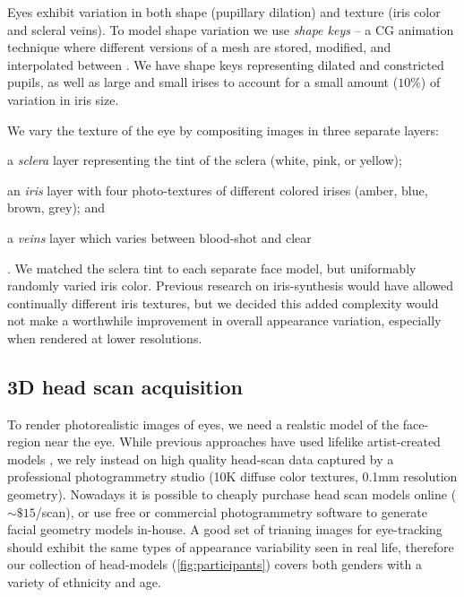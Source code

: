 Eyes exhibit variation in both shape (pupillary dilation) and texture (iris color and scleral veins). To model shape variation we use \emph{shape keys} -- a CG animation technique where different versions of a mesh are stored, modified, and interpolated between \cite{orvalho2012facial}.  We have shape keys representing dilated and constricted pupils, as well as large and small irises to account for a small amount ($10\%$) of variation in iris size.

We vary the texture of the eye by compositing images in three separate layers:
\begin{inparaenum}
\item a \emph{sclera} layer representing the tint of the sclera (white, pink, or yellow);
\item an \emph{iris} layer with four photo-textures of different colored irises (amber, blue, brown, grey); and
\item a \emph{veins} layer which varies between blood-shot and clear
\end{inparaenum}. We matched the sclera tint to each separate face model, but uniformably randomly varied iris color. Previous research on iris-synthesis  would have allowed continually different iris textures, but we decided this added complexity would not make a worthwhile improvement in overall appearance variation, especially when rendered at lower resolutions.

\subsection{3D head scan acquisition}
\label{sec:eye_region_geom_prep}



To render photorealistic images of eyes, we need a realstic model of the face-region near the eye. While previous approaches have used lifelike artist-created models \cite{swirski2014rendering}, we rely instead on high quality head-scan data captured by a professional photogrammetry studio (10K diffuse color textures, 0.1mm resolution geometry). Nowadays it is possible to cheaply purchase head scan models online ($\sim\!\$15$/scan), or use free or commercial photogrammetry software to generate facial geometry models in-house.
%
A good set of trianing images for eye-tracking should exhibit the same types of appearance variability seen in real life, therefore our collection of head-models (\autoref{fig:participants}) covers both genders with a variety of ethnicity and age.

